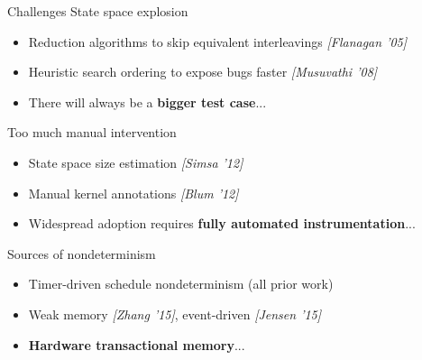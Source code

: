 \documentclass[xcolor=dvipsnames]{beamer}
\begin{document}
\begin{frame}{Challenges} %
	State space explosion
	\begin{itemize}
		\item Reduction algorithms to skip equivalent interleavings {\em [Flanagan '05]}
		\item Heuristic search ordering to expose bugs faster {\em [Musuvathi '08]}
			\pause
		\item There will always be a {\bf bigger test case}...
	\end{itemize}
	\pause
	\linegap

	Too much manual intervention %
	\begin{itemize}
		\item State space size estimation {\em [Simsa '12]}
		\item Manual kernel annotations {\em [Blum '12]} %
			\pause
		\item Widespread adoption requires {\bf fully automated instrumentation}...
	\end{itemize}
	\pause
	\linegap

	Sources of nondeterminism
	\begin{itemize}
		\item Timer-driven schedule nondeterminism (all prior work)
		\item Weak memory {\em [Zhang '15]},
			event-driven {\em [Jensen '15]}
			\pause
		\item {\bf Hardware transactional memory}...
	\end{itemize}
\end{frame}
\end{document}
